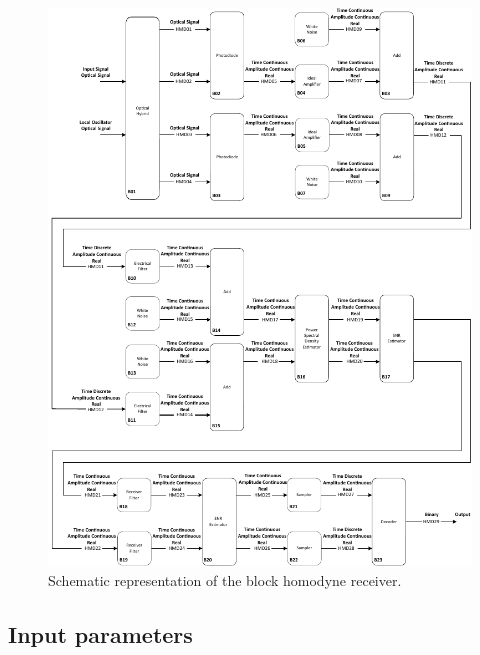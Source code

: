 \begin{figure}[h]
	\centering
	\includegraphics[width=\textwidth]{../lib/m_qam_receiver/figures/homodyneRx_blocks.pdf}
	\caption{Schematic representation of the block homodyne
	receiver.}\label{fig:homodyneRx_blocks}
\end{figure}

\subsection*{Input parameters}

